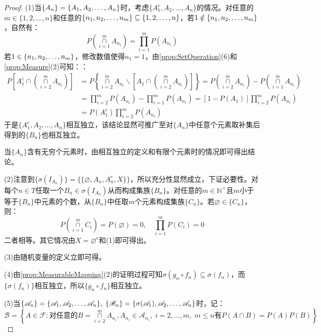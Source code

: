 \begin{proof}
	(1)当$\{A_n\}=\{A_1, A_2, \dots, A_{n}\}$时，考虑$\{A_1^c,A_2,\dots,A_n\}$的情况。对任意的$m\in\{1,2,\dots,n\}$和任意的$\{n_1, n_2, \dots, n_{m}\}\subseteq\{1,2,\dots,n\}$，若$1\notin\{n_1, n_2, \dots, n_{m}\}$，自然有：
	\begin{equation*}
		P\left(\underset{i=1}{\overset{m}{\cap}}A_{n_i}\right)=\prod_{i=1}^{m}P(A_{n_i})
	\end{equation*}
	若$1\in\{n_1, n_2, \dots, n_{m}\}$，修改数值使得$n_1=1$，由\cref{prop:SetOperation}(6)和\cref{prop:Measure}(2)可知：：
	\begin{align*}
		P\left[A_1^c\cap\left(\underset{i=2}{\overset{m}{\cap}}A_{n_i}\right)\right]&=P\left\{\underset{i=2}{\overset{m}{\cap}}A_{n_i}\backslash\left[A_1\cap\left(\underset{i=2}{\overset{m}{\cap}}A_{n_i}\right)\right]\right\}=P\left(\underset{i=2}{\overset{m}{\cap}}A_{n_i}\right)-P\left(\underset{i=1}{\overset{m}{\cap}}A_{n_i}\right) \\
		&=\prod_{i=2}^{m}P(A_{n_i})-\prod_{i=1}^{m}P(A_{n_i})=[1-P(A_1)]\prod_{i=2}^{m}P(A_{n_i}) \\
		&=P(A_1^c)\prod_{i=2}^{m}P(A_{n_i})
	\end{align*}
	于是$\{A_1^c,A_2,\dots,A_n\}$相互独立，该结论显然可推广至对$\{A_n\}$中任意个元素取补集后得到的$\{B_n\}$也相互独立。\par
	当$\{A_n\}$含有无穷个元素时，由相互独立的定义和有限个元素时的情况即可得出结论。\par
	(2)注意到$\{\sigma(I_{A_n})\}=\Big\{\{\varnothing,A_n,A_n^c,X\}\Big\}$，所以充分性显然成立，下证必要性。对每个$n\in T$任取一个$B_n\in\sigma(I_{A_n})$从而构成集族$\{B_n\}$。对任意的$m\in\mathbb{N}^+$且$m$小于等于$\{B_n\}$中元素的个数，从$\{B_n\}$中任取$m$个元素构成集族$\{C_n\}$。若$\varnothing\in\{C_n\}$，则：
	\begin{equation*}
		P\left(\underset{i=1}{\overset{m}{\cap}}C_i\right)=P(\varnothing)=0,\quad\prod_{i=1}^{m}P(C_i)=0
	\end{equation*}
	二者相等。其它情况由$X=\varnothing^c$和(1)即可得出。\par
	(3)由随机变量的定义立即可得。\par
	(4)由\cref{prop:MeasurableMapping}(2)的证明过程可知$\sigma(g_n\circ f_n)\subseteq\sigma(f_n)$，而$\{\sigma(f_n)\}$相互独立，所以$\{g_n\circ f_n\}$相互独立。\par
	(5)当$\{\mathscr{A}_n\}=\{\mathscr{A}_1, \mathscr{A}_2, \dots, \mathscr{A}_{n}\},\;\{\mathscr{B}_n\}=\{\sigma(\mathscr{A}_1),\mathscr{A}_2,\dots,\mathscr{A}_n\}$时，记：
	\begin{equation*}
		\mathscr{B}=\left\{A\in\mathscr{F}:\textbf{对任意的}B=\underset{i=2}{\overset{m}{\cap}}A_{n_i},A_{n_i}\in\mathscr{A}_{n_i},\;i=2,\dots,m,\;m\leqslant n\textbf{有}P(A\cap B)=P(A)P(B)\right\}

\end{equation*}
\end{proof}
